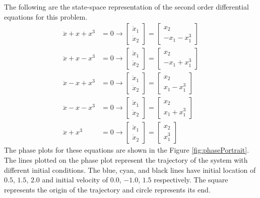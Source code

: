 \documentclass[12pt, a4paper]{extreport}
\begin{document}
The following are the state-space representation of the second order differential equations for this problem.
%
\begin{align}
\ddot{x} + x + x^3 &= 0 \longrightarrow
\begin{bmatrix}
	\dot{x}_1 \\
	\dot{x}_2
\end{bmatrix} = 
\begin{bmatrix}
	x_2 \\
	-x_1 - x_1^3
\end{bmatrix} \\
\ddot{x} + x - x^3 &= 0 \longrightarrow
\begin{bmatrix}
	\dot{x}_1 \\
	\dot{x}_2
\end{bmatrix} = 
\begin{bmatrix}
	x_2 \\
	-x_1 + x_1^3
\end{bmatrix} \\
\ddot{x} - x + x^3 &= 0 \longrightarrow
\begin{bmatrix}
	\dot{x}_1 \\
	\dot{x}_2
\end{bmatrix} = 
\begin{bmatrix}
	x_2 \\
	x_1 - x_1^3
\end{bmatrix} \\
\ddot{x} - x - x^3 &= 0 \longrightarrow
\begin{bmatrix}
	\dot{x}_1 \\
	\dot{x}_2
\end{bmatrix} = 
\begin{bmatrix}
	x_2 \\
	x_1 + x_1^3
\end{bmatrix} \\
\ddot{x} + x^3 &= 0 \longrightarrow
\begin{bmatrix}
	\dot{x}_1 \\
	\dot{x}_2
\end{bmatrix} = 
\begin{bmatrix}
	x_2 \\
	x_1^3
\end{bmatrix}
\end{align}
%
The phase plots for these equations are shown in the Figure \ref{fig:phasePortrait}. The lines plotted on the phase plot represent the trajectory of the system with different initial conditions. The blue, cyan, and black lines have initial location of $0.5$, $1.5$, $2.0$ and initial velocity of $0.0$, $-1.0$, $1.5$ respectively. The square represents the origin of the trajectory and circle represents its end. 
\end{document}
